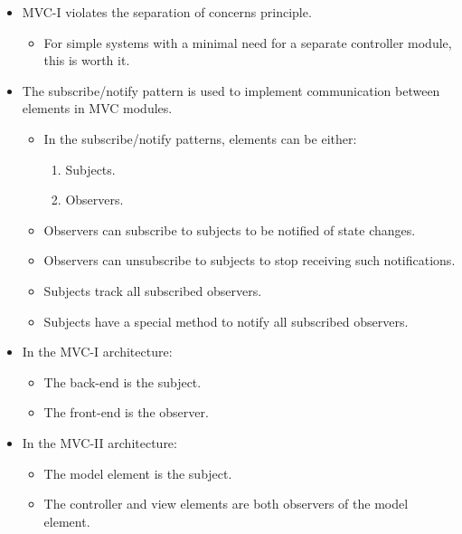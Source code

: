 \documentclass{article}
\begin{document}
\begin{itemize}
\begin{enumerate}
	\end{enumerate}
	\item MVC-I violates the separation of concerns principle.
	\begin{itemize}
		\item For simple systems with a minimal need for a separate controller module, this is worth it.
	\end{itemize}
	\item The subscribe/notify pattern is used to implement communication between elements in MVC modules.
	\begin{itemize}
		\item In the subscribe/notify patterns, elements can be either:
		\begin{enumerate}
			\item Subjects.
			\item Observers.
		\end{enumerate}
		\item Observers can subscribe to subjects to be notified of state changes.
		\item Observers can unsubscribe to subjects to stop receiving such notifications.
		\item Subjects track all subscribed observers.
		\item Subjects have a special method to notify all subscribed observers.
	\end{itemize}
	\item In the MVC-I architecture:
	\begin{itemize}
		\item The back-end is the subject.
		\item The front-end is the observer.
	\end{itemize}
	\item In the MVC-II architecture:
	\begin{itemize}
		\item The model element is the subject.
		\item The controller and view elements are both observers of the model element.
	\end{itemize}
\end{itemize}

\ifdefined\iscombined
	\newpage
\else
	
\end{document}
